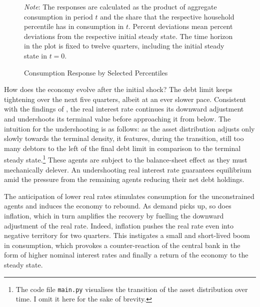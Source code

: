 \documentclass[a4paper,12pt]{article} %
\numberwithin{equation}{section} %
\numberwithin{figure}{section}
\numberwithin{table}{section}
\begin{document}
\begin{figure}[t]
    \centering
    \caption{Consumption Response by Selected Percentiles}
    \label{fig:baseline-permanent-limit-dist-c-response}
    

    \vspace{10pt}
    
    \begin{minipage}{0.75\textwidth} 
    \footnotesize
    \textit{Note}: The responses are calculated as the product of aggregate consumption in period $t$ and the share that the respective household percentile has in consumption in $t$. Percent deviations mean percent deviations from the respective initial steady state. The time horizon in the plot is fixed to twelve quarters, including the initial steady state in $t=0$.
    \end{minipage}
\end{figure}

How does the economy evolve after the initial shock? The debt limit keeps tightening over the next five quarters, albeit at an ever slower pace. Consistent with the findings of \textcite{gl2017}, the real interest rate continues its downward adjustment and undershoots its terminal value before approaching it from below. The intuition for the undershooting is as follows: as the asset distribution adjusts only slowly towards the terminal density, it features, during the transition, still too many debtors to the left of the final debt limit in comparison to the terminal steady state.\footnote{The code file \texttt{main.py} visualises the transition of the asset distribution over time. I omit it here for the sake of brevity.} These agents are subject to the balance-sheet effect as they must mechanically delever. An undershooting real interest rate guarantees equilibrium amid the pressure from the remaining agents reducing their net debt holdings.

The anticipation of lower real rates stimulates consumption for the unconstrained agents and induces the economy to rebound. As demand picks up, so does inflation, which in turn amplifies the recovery by fuelling the downward adjustment of the real rate. Indeed, inflation pushes the real rate even into negative territory for two quarters. This instigates a small and short-lived boom in consumption, which provokes a counter-reaction of the central bank in the form of higher nominal interest rates and finally a return of the economy to the steady state.
\end{document}
